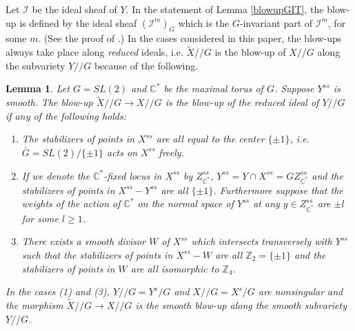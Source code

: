 \documentclass[10pt]{amsart}
\newtheorem{lemma}[theorem]{Lemma}
\theoremstyle{definition}
\newcommand{\CC}{\mathbb{C}}
\newcommand{\cI}{\mathcal{I}}
\def\git{/\!/ }
\begin{document}
Let $\cI$ be the ideal sheaf of $Y$. In the statement of Lemma
\ref{blowupGIT}, the blow-up is defined by the ideal sheaf
$(\cI^m)_G$ which is the $G$-invariant part of $\cI^m$,
for some $m$. (See the proof of \cite[Lemma
3.11]{Kirwan}.) In the cases considered in this paper, the
blow-ups always take place along \emph{reduced} ideals, i.e.
$\widetilde{X}\git G$ is the blow-up of $X\git G$ along the
subvariety $Y\git G$ because of the following.
\begin{lemma}\label{lem-specialcasebl}
Let $G=SL(2)$ and $\CC^*$ be the maximal torus of $G$. Suppose
$Y^{ss}$ is smooth. The blow-up $\widetilde{X}\git G\to X\git G$
is the blow-up of the reduced ideal of $Y\git G$ if any of the
following holds:
\begin{enumerate} \item The stabilizers of points in $X^{ss}$ are
all equal to the center $\{\pm 1\}$, i.e. $\bar G=SL(2)/\{\pm 1\}$
acts on $X^{ss}$ freely.
\item If we denote the $\CC^*$-fixed locus in $X^{ss}$ by
$Z^{ss}_{\CC^*}$, $Y^{ss}=Y\cap X^{ss}=GZ^{ss}_{\CC^*}$ and the
stabilizers of points in $X^{ss}-Y^{ss}$ are all $\{\pm 1\}$.
Furthermore suppose that the weights of the action of $\CC^*$ on
the normal space of $Y^{ss}$ at any $y\in Z^{ss}_{\CC^*}$ are $\pm
l$ for some $l\ge 1$.
\item There exists a smooth divisor $W$ of $X^{ss}$ which
intersects transversely with $Y^{ss}$ such that the stabilizers of
points in $X^{ss}-W$ are all $\mathbb{Z}_2=\{\pm 1\}$ and the
stabilizers of points in $W$ are all isomorphic to $\mathbb{Z}_4$.
\end{enumerate}
In the cases (1) and (3), $Y\git G=Y^s/G$ and $X\git G=X^s/G$ are
nonsingular and the morphism $\widetilde{X}\git G\to X\git G$ is
the smooth blow-up along the smooth subvariety $Y\git G$.
\end{lemma}
\end{document}
